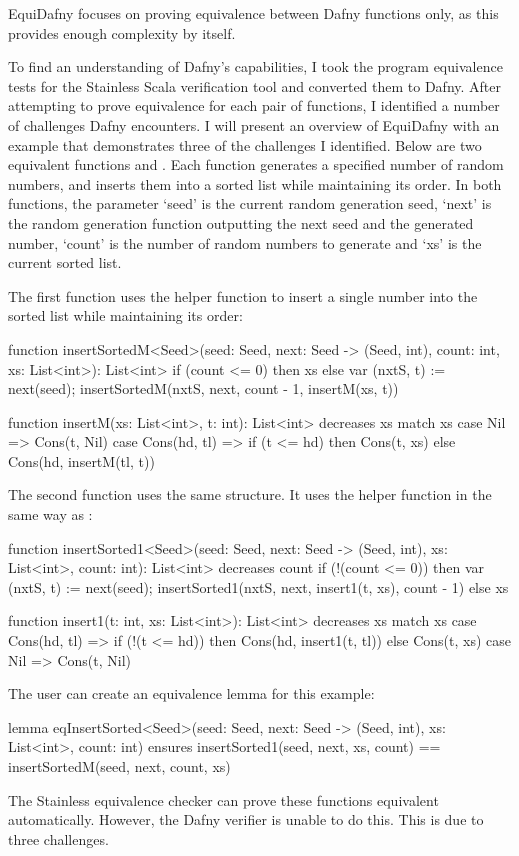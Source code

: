 EquiDafny focuses on proving equivalence between Dafny functions only, as this provides enough complexity by itself.

To find an understanding of Dafny's capabilities, I took the program equivalence tests for the Stainless Scala verification tool \parencite{StainlessFrontendsBenchmarks} and converted them to Dafny. After attempting to prove equivalence for each pair of functions, I identified a number of challenges Dafny encounters. I will present an overview of EquiDafny with an example that demonstrates three of the challenges I identified. Below are two equivalent functions  and . Each function generates a specified number of random numbers, and inserts them into a sorted list while maintaining its order. In both functions, the parameter `seed' is the current random generation seed, `next' is the random generation function outputting the next seed and the generated number, `count' is the number of random numbers to generate and `xs' is the current sorted list.

The first function uses the helper function  to insert a single number into the sorted list while maintaining its order:
\begin{dafny}
function insertSortedM<Seed>(seed: Seed, next: Seed -> (Seed, int), 
                             count: int, xs: List<int>): List<int>
  {
  if (count <= 0) then xs
  else
    var (nxtS, t) := next(seed);
    insertSortedM(nxtS, next, count - 1, insertM(xs, t))
}

function insertM(xs: List<int>, t: int): List<int>
  decreases xs {
  match xs {
    case Nil => Cons(t, Nil)
    case Cons(hd, tl) =>
      if (t <= hd) then Cons(t, xs) else Cons(hd, insertM(tl, t))
  }
}
\end{dafny}
%
The second function uses the same structure. It uses the helper function  in the same way as :
\begin{dafny}
function insertSorted1<Seed>(seed: Seed, next: Seed -> (Seed, int),
                             xs: List<int>, count: int): List<int>
  decreases count {
  if (!(count <= 0)) then 
    var (nxtS, t) := next(seed);
    insertSorted1(nxtS, next, insert1(t, xs), count - 1)
  else xs
}

function insert1(t: int, xs: List<int>): List<int>
  decreases xs {
  match xs {
    case Cons(hd, tl) =>
      if (!(t <= hd)) then Cons(hd, insert1(t, tl)) else Cons(t, xs)
    case Nil => Cons(t, Nil)
  }
}
\end{dafny}
%
The user can create an equivalence lemma for this example:
\begin{dafny}
lemma eqInsertSorted<Seed>(seed: Seed, next: Seed -> (Seed, int), 
                           xs: List<int>, count: int)
  ensures insertSorted1(seed, next, xs, count) == 
            insertSortedM(seed, next, count, xs)
{}
\end{dafny}
%
The Stainless equivalence checker can prove these functions equivalent automatically. However, the Dafny verifier is unable to do this. This is due to three challenges. 

